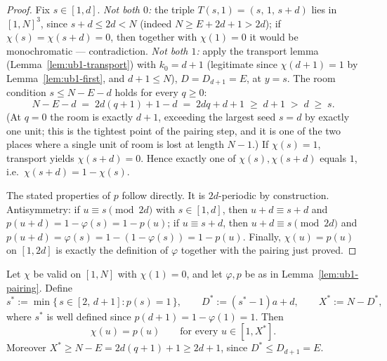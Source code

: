 \begin{proof}
Fix $s \in [1,d]$. \emph{Not both $0$:} the triple
$T(s,1) = (s,\, 1,\, s + d)$ lies in $[1,N]^3$, since
$s + d \le 2d < N$ (indeed $N \ge E + 2d + 1 > 2d$); if
$\chi(s) = \chi(s+d) = 0$, then together with $\chi(1) = 0$ it would be
monochromatic --- contradiction. \emph{Not both $1$:} apply the transport
lemma (Lemma~\ref{lem:ub1-transport}) with $k_0 = d+1$ (legitimate since
$\chi(d+1) = 1$ by Lemma~\ref{lem:ub1-first}, and $d + 1 \le N$),
$D = D_{d+1} = E$, at $y = s$. The room condition $s \le N - E - d$ holds
for every $q \ge 0$:
\[
N - E - d \;=\; 2d(q+1) + 1 - d \;=\; 2dq + d + 1 \;\ge\; d + 1 \;>\; d
\;\ge\; s .
\]
(At $q = 0$ the room is exactly $d + 1$, exceeding the largest seed
$s = d$ by exactly one unit; this is the tightest point of the pairing
step, and it is one of the two places where a single unit of room is lost
at length $N - 1$.) If $\chi(s) = 1$, transport yields $\chi(s + d) = 0$.
Hence exactly one of $\chi(s), \chi(s+d)$ equals $1$, i.e.\
$\chi(s+d) = 1 - \chi(s)$.

The stated properties of $p$ follow directly. It is $2d$-periodic by
construction. Antisymmetry: if $u \equiv s \pmod{2d}$ with $s \in [1,d]$,
then $u + d \equiv s + d$ and $p(u+d) = 1 - \varphi(s) = 1 - p(u)$; if
$u \equiv s + d$, then $u + d \equiv s \pmod{2d}$ and
$p(u + d) = \varphi(s) = 1 - (1 - \varphi(s)) = 1 - p(u)$. Finally,
$\chi(u) = p(u)$ on $[1,2d]$ is exactly the definition of $\varphi$
together with the pairing just proved.
\end{proof}

\begin{lemma}[window]\label{lem:ub1-window}
Let $\chi$ be valid on $[1,N]$ with $\chi(1) = 0$, and let $\varphi, p$ be
as in Lemma~\ref{lem:ub1-pairing}. Define
\[
s^{*} := \min\{\, s \in [2,\, d+1] : p(s) = 1 \,\}, \qquad
D^{*} := (s^{*} - 1)a + d, \qquad
X^{*} := N - D^{*} ,
\]
where $s^{*}$ is well defined since $p(d+1) = 1 - \varphi(1) = 1$. Then
\[
\chi(u) = p(u) \qquad \text{for every } u \in [1, X^{*}] .
\]
Moreover $X^{*} \ge N - E = 2d(q+1) + 1 \ge 2d + 1$, since
$D^{*} \le D_{d+1} = E$.
\end{lemma}

